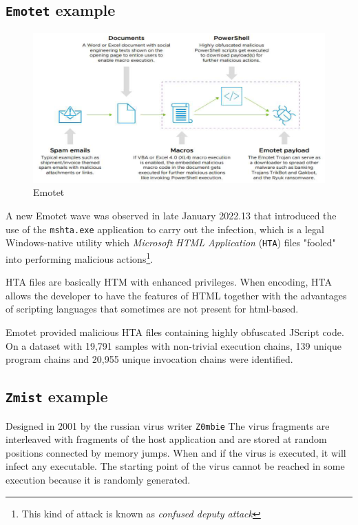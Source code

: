 \subsection{\texttt{Emotet} example}
\begin{figure}[htbp]
   \centering
   \includegraphics{images/emotet.png}
   \caption{Emotet}
   \label{fig:emotet}
\end{figure}

A new Emotet wave was observed in late January 2022.13 that introduced
the use of the \texttt{mshta.exe} application to carry out the infection,
which is a legal Windows-native utility which \textit{Microsoft HTML Application}
(\texttt{HTA}) files "fooled" into performing malicious actions\footnote{This kind of attack is known as \textit{confused deputy attack}}.\nl

HTA files are basically HTM with enhanced privileges. 
When encoding, HTA
allows the developer to have the features of HTML together with the
advantages of scripting languages that sometimes are not present for html-based.

Emotet provided malicious HTA files containing highly obfuscated JScript code.
On a dataset with 19,791 samples with non-trivial execution chains, 139 unique program chains and 20,955 unique invocation chains were identified.

\subsection{\texttt{Zmist} example}

Designed in 2001 by the russian virus writer \texttt{Z0mbie}
The virus fragments are interleaved with fragments of the host application and are stored at random positions connected by memory jumps.
When and if the virus is executed, it will infect any executable. 
The starting point of the virus cannot be reached in some execution because it is randomly generated.


